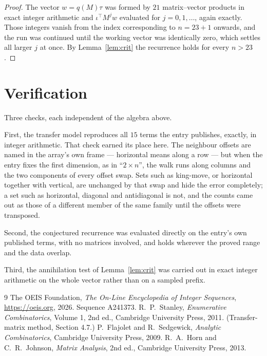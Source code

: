 \documentclass[11pt,a4paper]{article}
\theoremstyle{plain}
\theoremstyle{definition}
\begin{document}
\begin{proof}
The vector $w=q(M)\tau$ was formed by $21$ matrix--vector products in exact integer
arithmetic and $\iota^{\!\top}M^{j}w$ evaluated for $j=0,1,\dots$, again exactly. Those
integers vanish from the index corresponding to $n=23+1$ onwards, and the run was
continued until the working vector was identically zero, which settles all larger $j$ at once.
By Lemma~\ref{lem:crit} the recurrence holds for every $n>23$.
\end{proof}

\section{Verification}

Three checks, each independent of the algebra above.

First, the transfer model reproduces all $15$ terms the entry publishes, exactly, in
integer arithmetic. That check earned its place here. The neighbour offsets are named in the
array's own frame --- horizontal means along a row --- but when the entry fixes the first
dimension, as in ``$2\times n$'', the walk runs along columns and the two components of every
offset swap. Sets such as king-move, or horizontal together with vertical, are unchanged by
that swap and hide the error completely; a set such as horizontal, diagonal and antidiagonal
is not, and the counts came out as those of a different member of the same family until the
offsets were transposed.

Second, the conjectured recurrence was evaluated directly on the entry's own published terms,
with no matrices involved, and holds wherever the proved range and the data overlap.

Third, the annihilation test of Lemma~\ref{lem:crit} was carried out in exact integer
arithmetic on the whole vector rather than on a sampled prefix.

\begin{thebibliography}{9}
 The OEIS Foundation, \emph{The On-Line Encyclopedia of Integer
Sequences}, \url{https://oeis.org}, 2026. Sequence A241373.
 R.~P.~Stanley, \emph{Enumerative Combinatorics}, Volume 1, 2nd ed.,
Cambridge University Press, 2011. (Transfer-matrix method, Section 4.7.)
 P.~Flajolet and R.~Sedgewick, \emph{Analytic Combinatorics}, Cambridge
University Press, 2009.
 R.~A.~Horn and C.~R.~Johnson, \emph{Matrix Analysis}, 2nd ed., Cambridge
University Press, 2013.
\end{thebibliography}
\end{document}
